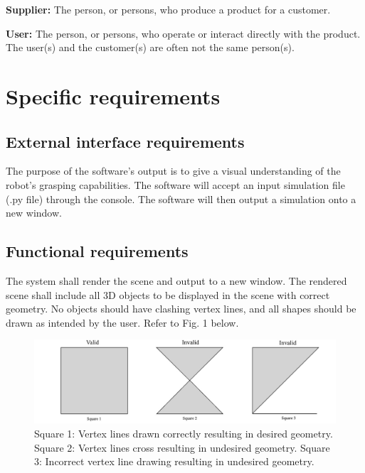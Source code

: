 \documentclass[10pt,journal,compsoc]{IEEEtran}
\begin{document}
\begin{flushleft}
\vspace{3mm}
\textbf{Supplier:}
The person, or persons, who produce a product for a customer.

\vspace{3mm}
\textbf{User:}
The person, or persons, who operate or interact directly with the product. The user(s) and the customer(s) are often not the same person(s).

\newpage

\section{Specific requirements}
\vspace{3mm}

\subsection{External interface requirements}
\vspace{3mm}
The purpose of the software's output is to give a visual understanding of the robot's grasping capabilities.
The software will accept an input simulation file (.py file) through the console.
The software will then output a simulation onto a new window.

\subsection{Functional requirements}
\vspace{3mm}
The system shall render the scene and output to a new window.
The rendered scene shall include all 3D objects to be displayed in the scene with correct geometry.
No objects should have clashing vertex lines, and all shapes should be drawn as intended by the user.
Refer to Fig. 1 below.

\begin{figure} [h]
  \includegraphics[width=\linewidth]{squares.jpg}
  \caption
{ \newline \hspace{\linewidth}
Square 1: Vertex lines drawn correctly resulting in desired geometry. \newline \hspace{\linewidth}
Square 2: Vertex lines cross resulting in undesired geometry. \newline \hspace{\linewidth}
Square 3: Incorrect vertex line drawing resulting in undesired geometry.}
  \label{fig:squares}
\end{figure}


\end{flushleft}
\end{document}
